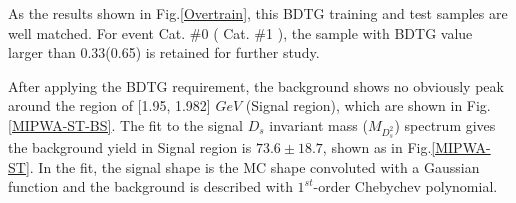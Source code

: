 \par{As the results shown in Fig.\ref{Overtrain}, this BDTG training and test samples are well matched. For event Cat. \#0 ( Cat. \#1 ), the sample with BDTG value larger than 0.33(0.65) is retained for further study. 
    
    
    
    After applying the BDTG requirement, the background shows no obviously peak around the region of [1.95, 1.982] $GeV$ (Signal region), which are shown in Fig.\ref{MIPWA-ST-BS}.  The fit to the signal $D_{s}$ invariant mass ($M_{D_{s}^{2}}$) spectrum gives the background yield in Signal region is $73.6\pm18.7$, shown as in Fig.\ref{MIPWA-ST}. In the fit, the signal shape is the MC shape convoluted with a Gaussian function and the background is described with $1^{st}$-order Chebychev polynomial.


}


